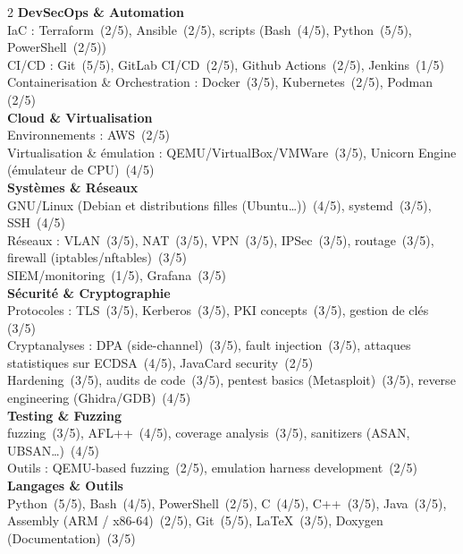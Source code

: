 \documentclass[10pt,a4paper]{article}
\newcommand{\score}[1]{\,(#1/5)}
\begin{document}
\begin{multicols}{2}
\textbf{DevSecOps \& Automation}\\
IaC : Terraform \score{2}, Ansible \score{2}, scripts (Bash \score{4}, Python \score{5}, PowerShell \score{2})\\
CI/CD : Git \score{5}, GitLab CI/CD \score{2}, Github Actions \score{2}, Jenkins \score{1}\\
Containerisation \& Orchestration : Docker \score{3}, Kubernetes \score{2}, Podman \score{2}\\[6pt]

\textbf{Cloud \& Virtualisation}\\
Environnements : AWS \score{2}\\
Virtualisation \& émulation : QEMU/VirtualBox/VMWare \score{3}, Unicorn Engine (émulateur de CPU) \score{4}\\[6pt]

\textbf{Systèmes \& Réseaux}\\
GNU/Linux (Debian et distributions filles (Ubuntu\dots)) \score{4}, systemd \score{3}, SSH \score{4}\\
Réseaux : VLAN \score{3}, NAT \score{3}, VPN \score{3}, IPSec \score{3}, routage \score{3}, firewall (iptables/nftables) \score{3}\\
SIEM/monitoring \score{1}, Grafana \score{3}\\[6pt]

\textbf{Sécurité \& Cryptographie}\\
Protocoles : TLS \score{3}, Kerberos \score{3}, PKI concepts \score{3}, gestion de clés \score{3}\\
Cryptanalyses : DPA (side-channel) \score{3}, fault injection \score{3}, attaques statistiques sur ECDSA \score{4}, JavaCard security \score{2}\\
Hardening \score{3}, audits de code \score{3}, pentest basics (Metasploit) \score{3}, reverse engineering (Ghidra/GDB) \score{4}\\[6pt]

\textbf{Testing \& Fuzzing}\\
fuzzing \score{3}, AFL++ \score{4}, coverage analysis \score{3}, sanitizers (ASAN, UBSAN\dots) \score{4}\\
Outils : QEMU-based fuzzing \score{2}, emulation harness development \score{2}\\[6pt]

\textbf{Langages \& Outils}\\
Python \score{5}, Bash \score{4}, PowerShell \score{2}, C \score{4}, C++ \score{3}, Java \score{3}, Assembly (ARM / x86-64) \score{2}, Git \score{5}, LaTeX \score{3}, Doxygen (Documentation) \score{3}
\end{multicols}
\end{document}
